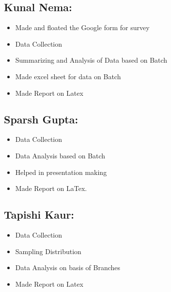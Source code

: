 \documentclass[12pt,a4paper]{report}
\begin{document}
\subsection*{Kunal Nema: }
\begin{itemize}
    \item Made and floated the Google form for survey
    \item Data Collection
    \item Summarizing and Analysis of Data based on Batch
    \item Made excel sheet for data on Batch
    \item Made Report on Latex
\end{itemize}
\subsection*{Sparsh Gupta: }
\begin{itemize}
    
    \item Data Collection
    \item Data Analysis based on Batch
    \item Helped in presentation making
    \item Made Report on LaTex.
    
\end{itemize}
\subsection*{Tapishi Kaur: }
\begin{itemize}
    
    \item Data Collection
    \item Sampling Distribution
    \item Data Analysis on basis of Branches
    \item Made Report on Latex
\end{itemize}
\end{document}
